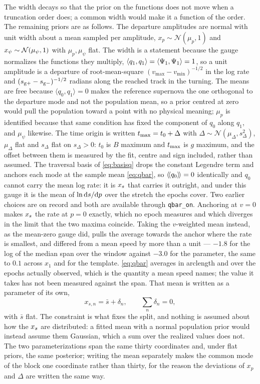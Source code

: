 \documentclass[11pt]{article}
\theoremstyle{plain}
\begin{document}
The width decays so that the prior on the functions does not move when a truncation order
does; a common width would make it a function of the order. The remaining priors are as
follows. The departure amplitudes are normal with unit width about a mean sampled per
amplitude, $x_p \sim \mathcal{N}(\mu_{p}, 1)$ and $x_{\psi} \sim \mathcal{N}(\mu_{\psi}, 1)$
with $\mu_{p}, \mu_{\psi}$ flat. The width is a statement because the gauge normalizes the
functions they multiply, $\langle q_{1}, q_{1}\rangle = \langle \Psi_{1}, \Psi_{1}\rangle = 1$,
so a unit amplitude is a departure of root-mean-square $(v_{\max} - v_{\min})^{-1/2}$ in
the log rate and $(s_{\mathrm{g}+} - s_{\mathrm{g}-})^{-1/2}$ radians along the reached track in the turning. The means are free because
$\langle q_{0}, q_{1}\rangle = 0$ makes the reference supernova the one orthogonal to the
departure mode and not the population mean, so a prior centred at zero would pull the
population toward a point with no physical meaning; $\mu_{p}$ is identified because that
same condition has fixed the component of $q_{0}$ along $q_{1}$, and $\mu_{\psi}$ likewise.
The time origin is written
$t_{\mathrm{max}} = t_{0} + \Delta$ with $\Delta \sim \mathcal{N}(\mu_{\Delta}, s_{\Delta}^{2})$,
$\mu_{\Delta}$ flat and $s_{\Delta}$ flat on $s_{\Delta} > 0$: $t_{0}$ is $B$ maximum and
$t_{\mathrm{max}}$ is $g$ maximum, and the offset between them is measured by the fit, centre and
sign included, rather than assumed. The traversal basis of \eqref{eq:basisq} drops the constant Legendre term and anchors each
mode at the sample mean \eqref{eq:qbar}, so $\left\langle\!\left\langle q_{0} \right\rangle\!\right\rangle = 0$ identically and $q_{0}$
cannot carry the mean log rate: it is $x_{s}$ that carries it outright, and under this
gauge it is the mean of $\ln \mathrm{d}s/\mathrm{d} p$ over the stretch the epochs cover. Two earlier
choices are on record and both are available through \texttt{qbar\_on}. Anchoring at $v = 0$
makes $x_{s}$ the rate at $p = 0$ exactly, which no epoch measures and which diverges in
the limit that the two maxima coincide. Taking the $v$-weighted mean instead, as the
mean-zero gauge did, pulls the average towards the anchor where the rate is smallest, and
differed from a mean speed by more than a unit --- $-1.8$ for the log of the median span over
the window against $-3.0$ for the parameter, the same to $0.1$ across $x_{1}$ and for the
\citet{Hsiao2007} template. \eqref{eq:qbar} averages in arclength and over the epochs
actually observed, which is the quantity a mean speed names; the value it takes has not been
measured against the span. That mean is written as a parameter of its own,
\begin{equation}
  x_{s,n} = \bar s + \delta_{n} , \qquad \sum_{n} \delta_{n} = 0 ,
  \label{eq:xsmean}
\end{equation}
with $\bar s$ flat. The constraint is what fixes the split, and nothing is assumed about how
the $x_{s}$ are distributed: a fitted mean with a normal population prior would instead
assume them Gaussian, which a sum over the realized values does not. The two
parameterizations span the same thirty coordinates and, under flat priors, the same
posterior; writing the mean separately makes the common mode of the block one coordinate
rather than thirty, for the reason the deviations of $x_p$ and $\Delta$ are written the same
way.
\end{document}

